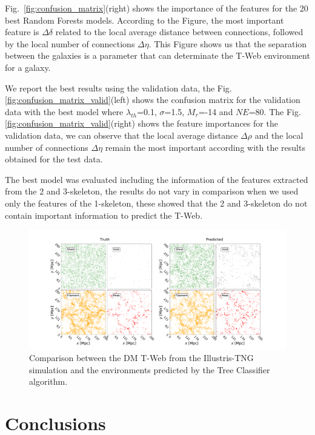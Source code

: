 \documentclass[usenatbib]{mnras}
\begin{document}
Fig.~\ref{fig:confusion_matrix}(right) shows the importance of the features
for the 20 best Random Forests models. According to the Figure, the 
most important feature is $\Delta \delta$
related to the local average distance between connections, followed by
the local number of connections $\Delta \eta$. This Figure shows
us that the separation between the galaxies is a parameter that can determinate the T-Web environment for a galaxy. 

We report the best results using the validation data, the Fig. \ref{fig:confusion_matrix_valid}(left) shows the confusion matrix for the validation data with the best model where $\lambda_{th}$=0.1, $\sigma$=1.5, $M_r$=-14 and $NE$=80. The Fig. \ref{fig:confusion_matrix_valid}(right) shows the feature importances for the validation data, we can observe that the local average distance $\Delta \rho$ and the local number of connections $\Delta \eta$ remain the most important according with the results obtained for the test data.

The best model was evaluated including the information of the features
extracted from the 2 and 3-skeleton, the results do not vary in
comparison when we used only the features of the 1-skeleton, these
showed that the 2 and 3-skeleton do not contain important information
to predict the T-Web. 


\begin{figure}
  \centering 
    \includegraphics[scale=0.25]{Figs/p_environment_predicted.pdf}
    \caption{Comparison between the DM T-Web from the Illustris-TNG
      simulation and the environments predicted by the Tree Classifier
      algorithm.} 
    \label{fig:prediction}
\end{figure}


\section{Conclusions}\label{sec:conclusions}
\end{document}
